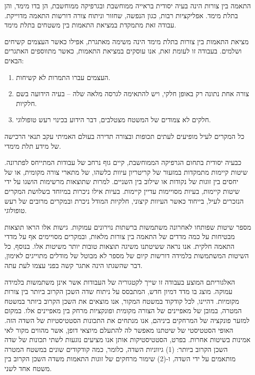 התאמה בין צורות הינה בעיה יסודית בראייה  ממוחשבת ובגרפיקה ממוחשבת, הן בדו מימד, והן בתלת מימד. אפליקציות רבות, כגון הנפשה, שחזור וניתוח צורה דורשות התאמה מדוייקת. עבודה זאת מתמקדת במציאת התאמות בין משטחים בתלת מימד. 

מציאת התאמות בין צורות בתלת מימד הינה משימה מאתגרת, אפילו כאשר העצמים קשיחים ושלמים. בעבודה זו לעומת זאת, אנו עוסקים במציאת התאמות, כאשר מתווספים האתגרים הבאים:
\begin{enumerate}
    \item העצמים עברו התמרות לא קשיחות.
    \item צורה אחת נתונה רק באופן חלקי, ויש להתאימה לגרסה מלאה שלה – בעיה הידועה בשם חלקיות.
    \item 	חלקים לא צמודים של המשטח מצטלבים, דבר הידוע בכינוי רעש טופולוגי.
\end{enumerate}
כל המקרים לעיל מופיעים לעתים תכופות ובצורה תדירה בעולם האמיתי עקב תנאי הרכישה של מידע תלת מימדי.

כבעיה יסודית בתחום הגרפיקה הממוחשבת, קיים גוף נרחב של עבודות המתייחס לפתרונה. שיטות קיימות מתמקדות במזעור של קריטריון עיוות כלשהו, של מתארי צורה מקומית, או של יחסים בין זוגות של נקודות או שילוב בין השניים. למרות שתוצאות מרשימות הושגו על ידי שיטות קיימות, בעיות מסויימות עדיין קיימות. בעיות אילו ניכרות במיוחד בשלושת המקרים הנזכרים לעיל, בייחוד כאשר העיוות קיצוני, חלקיות המודל ניכרת ובמקרים מרובים של רעש טופולוגי.

מספר שיטות שפותחו לאחרונה משתמשות ברשתות נוירונים עמוקות. גישות אלו הראו תוצאות מבטיחות על כמה מדדים של התאמה בין צורות מלאות, ובמקרים מסויימים אף על מדדי התאמה חלקית. אנו נראה ששיטתנו משיגה תוצאות טובות יותר משיטות אלו. בנוסף, כל השיטות המשתמשות בלמידה דורשות קיום של מספר לא מבוטל של מודלים מתוייגים לאימון, דבר שהשגתו הינה אתגר קשה בפני עצמו לעת עתה.

האלגוריתם המוצע בעבודה זו שייך לקטגוריה של העבודות אשר אינן משתמשות בלמידה עמוקה. מוצג בו מדד דמיון חדש, המתבסס על ניתוח שדה השכן הקרוב ביותר בין צורות מקומיות. דהיינו, לכל קודקוד במשטח המקור, אנו מוצאים את השכן הקרוב ביותר במשטח המטרה, במובן של מאפיינים של הצורה מקומית ופונקציות מרחק בין מאפיינים אלו. במקום למזער פונקציה של המרחקים ביניהם, אנו מנתחים את התכונות הסטטיסטיות של השדה הזה. האופי הסטטיסטי של שיטתנו מאפשר לה להתעלם מיוצאי דופן, אשר מהווים מקור לאי אמינות בשיטות אחרות. בפרט, הסטטיסטיקות אותן אנו מציעים נוגעות לשתי תכונות של שדה השכן הקרוב ביותר: (1) גיווניות השדה, כלומר, כמה קודקודים שונים במשטח המטרה מותאמים על ידי השדה, ו-(2) שימור מרחקים של זוגות התאמות משדה השכן הקרוב בין משטח אחד לשני.

